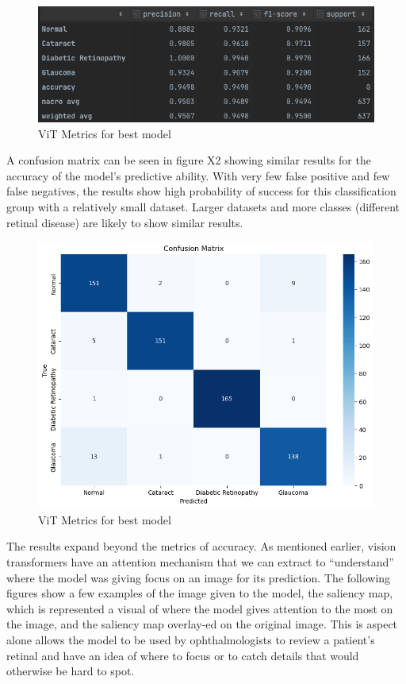 \documentclass[sigconf]{acmart}
\begin{document}
\begin{figure}[h]
  \centering
  \includegraphics[width=\linewidth]{samples/resources/Metrics.png}
  \caption{ViT Metrics for best model}
\end{figure}

A confusion matrix can be seen in figure X2 showing similar results for the accuracy of the model’s predictive ability. With very few false positive and few false negatives, the results show high probability of success for this classification group with a relatively small dataset. Larger datasets and more classes (different retinal disease) are likely to show similar results. 

\begin{figure}[h]
  \centering
  \includegraphics[width=\linewidth]{samples/resources/Confusion Matrix.png}
  \caption{ViT Metrics for best model}
\end{figure}

The results expand beyond the metrics of accuracy. As mentioned earlier, vision transformers have an attention mechanism that we can extract to “understand” where the model was giving focus on an image for its prediction. The following figures show a few examples of the image given to the model, the saliency map, which is represented a visual of where the model gives attention to the most on the image, and the saliency map overlay-ed on the original image. This is aspect alone allows the model to be used by ophthalmologists to review a patient’s retinal and have an idea of where to focus or to catch details that would otherwise be hard to spot.
\end{document}

